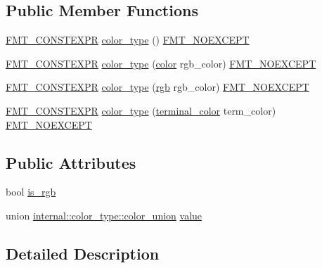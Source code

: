 \subsection*{Public Member Functions}
\begin{DoxyCompactItemize}
\item 
\hyperlink{core_8h_a69201cb276383873487bf68b4ef8b4cd}{F\+M\+T\+\_\+\+C\+O\+N\+S\+T\+E\+X\+PR} \hyperlink{structinternal_1_1color__type_a181efa4f00747d5d0fc4f9935859f605}{color\+\_\+type} () \hyperlink{core_8h_aef128913e8400683b1cbd1a3a2e11df3}{F\+M\+T\+\_\+\+N\+O\+E\+X\+C\+E\+PT}
\item 
\hyperlink{core_8h_a69201cb276383873487bf68b4ef8b4cd}{F\+M\+T\+\_\+\+C\+O\+N\+S\+T\+E\+X\+PR} \hyperlink{structinternal_1_1color__type_a8c0db95d7ceb5c1361978a7690492037}{color\+\_\+type} (\hyperlink{color_8h_a80d1dc5f416b97f92939a4166d41203c}{color} rgb\+\_\+color) \hyperlink{core_8h_aef128913e8400683b1cbd1a3a2e11df3}{F\+M\+T\+\_\+\+N\+O\+E\+X\+C\+E\+PT}
\item 
\hyperlink{core_8h_a69201cb276383873487bf68b4ef8b4cd}{F\+M\+T\+\_\+\+C\+O\+N\+S\+T\+E\+X\+PR} \hyperlink{structinternal_1_1color__type_ae44cd569407f2aa65168a7fa8234a3f2}{color\+\_\+type} (\hyperlink{structrgb}{rgb} rgb\+\_\+color) \hyperlink{core_8h_aef128913e8400683b1cbd1a3a2e11df3}{F\+M\+T\+\_\+\+N\+O\+E\+X\+C\+E\+PT}
\item 
\hyperlink{core_8h_a69201cb276383873487bf68b4ef8b4cd}{F\+M\+T\+\_\+\+C\+O\+N\+S\+T\+E\+X\+PR} \hyperlink{structinternal_1_1color__type_aa28b15cadf9646f33c7c25c2428befb9}{color\+\_\+type} (\hyperlink{color_8h_a76f7aa9aae46c2ea7333dae7b531d6ac}{terminal\+\_\+color} term\+\_\+color) \hyperlink{core_8h_aef128913e8400683b1cbd1a3a2e11df3}{F\+M\+T\+\_\+\+N\+O\+E\+X\+C\+E\+PT}
\end{DoxyCompactItemize}
\subsection*{Public Attributes}
\begin{DoxyCompactItemize}
\item 
bool \hyperlink{structinternal_1_1color__type_ac4c20ebcaa52cafe86f90ba580183845}{is\+\_\+rgb}
\item 
union \hyperlink{unioninternal_1_1color__type_1_1color__union}{internal\+::color\+\_\+type\+::color\+\_\+union} \hyperlink{structinternal_1_1color__type_ad7ac9b3ff11c9da97b0da326708ba530}{value}
\end{DoxyCompactItemize}


\subsection{Detailed Description}



